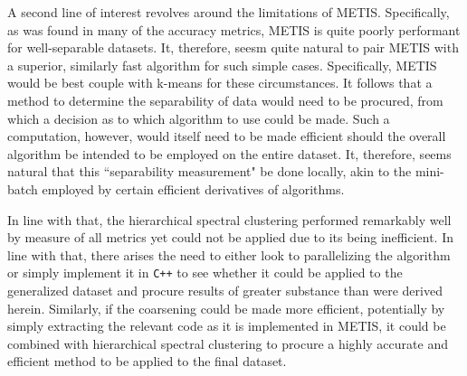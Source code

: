\documentclass{article}
\begin{document}
A second line of interest revolves around the limitations of METIS. Specifically, as was found in many of the accuracy metrics, METIS is quite poorly performant for well-separable datasets. It, therefore, seesm quite natural to pair METIS with a superior, similarly fast algorithm for such simple cases. Specifically, METIS would be best couple with k-means for these circumstances. It follows that a method to determine the separability of data would need to be procured, from which a decision as to which algorithm to use could be made. Such a computation, however, would itself need to be made efficient should the overall algorithm be intended to be employed on the entire dataset. It, therefore, seems natural that this ``separability measurement" be done locally, akin to the mini-batch employed by certain efficient derivatives of algorithms.

In line with that, the hierarchical spectral clustering performed remarkably well by measure of all metrics yet could not be applied due to its being inefficient. In line with that, there arises the need to either look to parallelizing the algorithm or simply implement it in \texttt{C++} to see whether it could be applied to the generalized dataset and procure results of greater substance than were derived herein. Similarly, if the coarsening could be made more efficient, potentially by simply extracting the relevant code as it is implemented in METIS, it could be combined with hierarchical spectral clustering to procure a highly accurate and efficient method to be applied to the final dataset.
\end{document}
